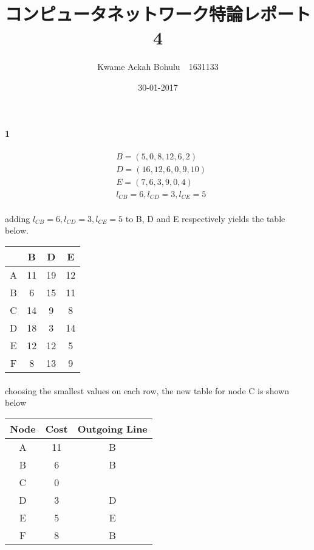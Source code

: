 \documentclass[24 pts]{article}
\title{コンピュータネットワーク特論レポート4	 }
\date{30-01-2017}
\author{Kwame Ackah Bohulu　1631133}
\begin{document}
\maketitle
\newpage
\paragraph{1}
\begin{equation*}
\begin{split}
&B=(5,0,8,12,6,2)\\ 
&D=(16, 12, 6, 0, 9, 10)\\
&E=(7, 6, 3, 9, 0, 4)\\
&l_{CB}=6, l_{CD}=3, l_{CE}=5
\end{split}
\end{equation*}

\paragraph{}
adding $l_{CB}=6, l_{CD}=3, l_{CE}=5$ to B, D and E respectively yields the table below.
\begin{center}
\begin{tabular}{|c|c|c|c|}
\hline
&B & D & E\\
\hline
A&11 & 19 & 12\\
B&6 & 15 & 11\\
C&14 & 9 & 8\\
D&18 & 3 & 14\\
E&12 & 12 & 5\\
F&8 & 13 & 9\\
\hline
\end{tabular}
\end{center}
\paragraph{}
choosing the smallest values on each row, the new table for node C is shown below

\begin{center}
\begin{tabular}{|c|c|c|}
\hline
Node& Cost & Outgoing Line\\
\hline
A & 11 & B\\
B & 6 & B\\
C & 0 & ~\\
D & 3 & D\\
E  & 5 & E\\
F & 8 & B\\
\hline
\end{tabular}
\end{center}
\end{document}
